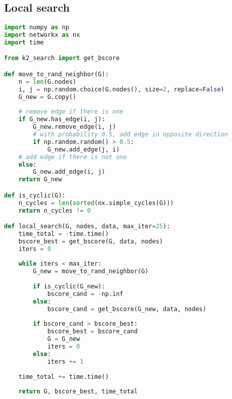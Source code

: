 \documentclass[twoside,11pt]{article}
\begin{document}
\subsection{Local search} 
\begin{algorithm}
\begin{lstlisting}[language=Python]
import numpy as np
import networkx as nx
import time

from k2_search import get_bscore

def move_to_rand_neighbor(G):
    n = len(G.nodes)
    i, j = np.random.choice(G.nodes(), size=2, replace=False)
    G_new = G.copy()
    
    # remove edge if there is one
    if G_new.has_edge(i, j):
        G_new.remove_edge(i, j)
        # with probability 0.5, add edge in opposite direction
        if np.random.random() > 0.5:
            G_new.add_edge(j, i)       
    # add edge if there is not one
    else:
        G_new.add_edge(i, j)
    return G_new

def is_cyclic(G):
    n_cycles = len(sorted(nx.simple_cycles(G)))
    return n_cycles != 0

def local_search(G, nodes, data, max_iter=25):
    time_total = -time.time()
    bscore_best = get_bscore(G, data, nodes)
    iters = 0
    
    while iters < max_iter:
        G_new = move_to_rand_neighbor(G)
        
        if is_cyclic(G_new):
            bscore_cand = -np.inf
        else:
            bscore_cand = get_bscore(G_new, data, nodes)
            
        if bscore_cand > bscore_best:
            bscore_best = bscore_cand
            G = G_new
            iters = 0
        else:
            iters += 1
        
    time_total += time.time()
            
    return G, bscore_best, time_total
    
\end{lstlisting}
\end{algorithm}
\end{document}
